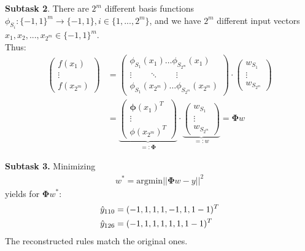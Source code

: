\documentclass{beamer}
\begin{document}
\begin{frame}
	\textbf{Subtask 2}.
	There are $2^m$ different basis functions $\phi_{S_i}:\{-1,1\}^m \to \{-1,1\}, i\in\{1,...,2^m\}$, 
	and we have $2^m$ different input vectors $x_1,x_2,...,x_{2^m} \in \{-1,1\}^m$.\\
	Thus:
	\begin{align*}
		\left(\begin{matrix}
		f(x_1)\\
		\vdots\\
		f(x_{2^m})
		\end{matrix}\right) &= 
		\left(\begin{matrix}
		\phi_{S_1}(x_1) \dots \phi_{S_{2^m}}(x_1)\\
		\vdots\qquad \ddots\qquad \vdots\\
		\phi_{S_1}(x_{2^m}) \dots \phi_{S_{2^m}}(x_{2^m})
		\end{matrix}\right) \cdot
		\left(\begin{matrix}
		w_{S_1}\\
		\vdots\\
		w_{S_{2^m}}
		\end{matrix}\right) \\&=
		\underbrace{\left(\begin{matrix}
		\mathbf{\phi}(x_1)^T\\
		\vdots \\
		\phi(x_{2^m})^T
		\end{matrix}\right)}_{=:\mathbf{\Phi}}\cdot
		\underbrace{\left(\begin{matrix}
		w_{S_1}\\
		\vdots\\
		w_{S_{2^m}}
		\end{matrix}\right)}_{=:w}
		 = \mathbf{\Phi} w
	\end{align*}	
\end{frame}

\begin{frame}
\textbf{Subtask 3.} Minimizing
	\begin{align*}
	w^* = \text{argmin}||\mathbf{\Phi} w - y||^2	
	\end{align*}
	yields for $\mathbf{\mathbf{\Phi}}w^*$:
	\begin{align*}
	\hat{y}_{110} &= (-1,1,1,1,-1,1,1-1)^T \\\bigskip
	\hat{y}_{126} &=  (-1,1,1,1,1,1,1-1)^T
	\end{align*}
	The reconstructed rules match the original ones.
\end{frame}
\end{document}
